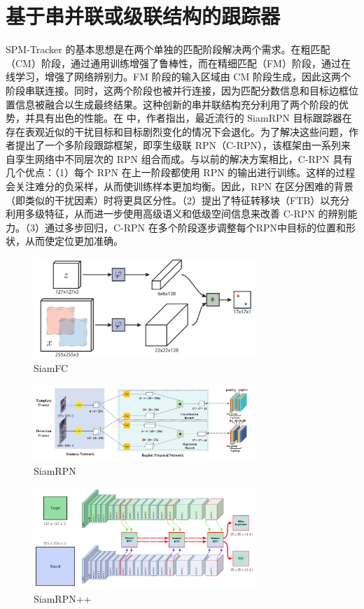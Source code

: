 \section{基于串并联或级联结构的跟踪器}
SPM-Tracker \cite{SPM} 的基本思想是在两个单独的匹配阶段解决两个需求。在粗匹配（CM）阶段，通过通用训练增强了鲁棒性，而在精细匹配（FM）阶段，通过在线学习，增强了网络辨别力。FM 阶段的输入区域由 CM 阶段生成，因此这两个阶段串联连接。同时，这两个阶段也被并行连接，因为匹配分数信息和目标边框位置信息被融合以生成最终结果。这种创新的串并联结构充分利用了两个阶段的优势，并具有出色的性能。在 \cite{fan2019siamese} 中，作者指出，最近流行的 SiamRPN \cite{SiamRPN} 目标跟踪器在存在表观近似的干扰目标和目标剧烈变化的情况下会退化。为了解决这些问题，作者提出了一个多阶段跟踪框架，即孪生级联 RPN（C-RPN），该框架由一系列来自孪生网络中不同层次的 RPN 组合而成。与以前的解决方案相比，C-RPN 具有几个优点：（1）每个 RPN 在上一阶段都使用 RPN 的输出进行训练。这样的过程会关注难分的负采样，从而使训练样本更加均衡。因此，RPN 在区分困难的背景（即类似的干扰因素）时将更具区分性。（2）提出了特征转移块（FTB）以充分利用多级特征，从而进一步使用高级语义和低级空间信息来改善 C-RPN 的辨别能力。（3）通过多步回归，C-RPN 在多个阶段逐步调整每个RPN中目标的位置和形状，从而使定位更加准确。
\iffalse
\begin{figure}
\centering
\includegraphics[width=0.75\textwidth]{Img/related/SiamFC.png}
\caption{SiamFC}
\end{figure}

\begin{figure}
\centering
\includegraphics[width=0.75\textwidth]{Img/related/SiamRPN.png}
\caption{SiamRPN}
\end{figure}

\begin{figure}
\centering
\includegraphics[width=0.75\textwidth]{Img/related/SiamRPN++.png}
\caption{SiamRPN++}
\end{figure}


